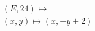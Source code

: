 \documentclass[preview]{standalone}
\begin{document}
\begin{align*}
&(E,24) \mapsto \\& (x,y) \mapsto (x, -y + 2)
\end{align*}
\end{document}
